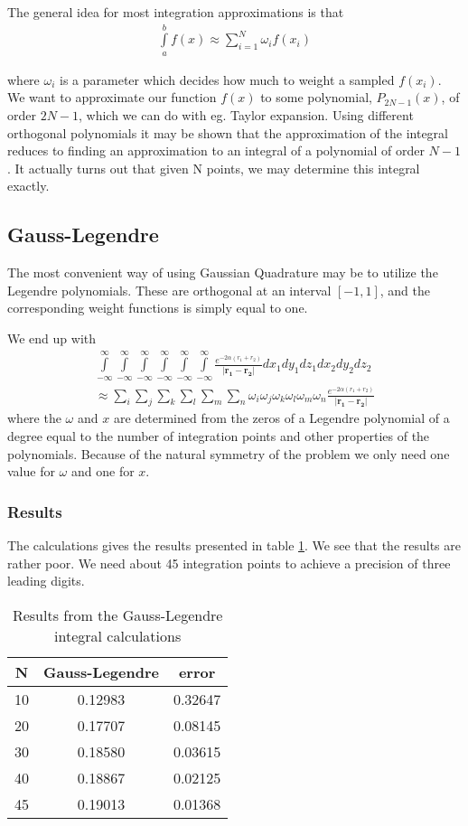 \documentclass[11pt, a4paper]{article}
\begin{document}
The general idea for most integration approximations is that
\begin{gather}
\int\limits_a^b f(x) \approx \sum\limits_{i=1}^N\omega_if(x_i)
\end{gather}

where $\omega_i$ is a parameter which decides how much to weight a sampled $f(x_i)$. We want to approximate our function $f(x)$ to some polynomial, $P_{2N-1}(x)$, of order $2N-1$, which we can do with eg. Taylor expansion. Using different orthogonal polynomials it may be shown that the approximation of the integral reduces to finding an approximation to an integral of a polynomial of order $N-1$. It actually turns out that given N points, we may determine this integral exactly.

\subsection{Gauss-Legendre}
The most convenient way of using Gaussian Quadrature may be to utilize the Legendre polynomials. These are orthogonal at an interval $[-1,1]$, and the corresponding weight functions is simply equal to one.

We end up with 
\begin{gather}
\int\limits_{-\infty}^\infty\int\limits_{-\infty}^\infty\int\limits_{-\infty}^\infty\int\limits_{-\infty}^\infty\int\limits_{-\infty}^\infty\int\limits_{-\infty}^\infty \frac{e^{-2\alpha(r_1+r_2)}}{|\mathbf{r_1}-\mathbf{r_2}|} dx_1dy_1dz_1dx_2dy_2dz_2\\
\approx \sum\limits_i\sum\limits_j\sum\limits_k\sum\limits_l\sum\limits_m\sum\limits_n \omega_i\omega_j\omega_k\omega_l\omega_m\omega_n \frac{e^{-2\alpha(r_1+r_2)}}{|\mathbf{r_1}-\mathbf{r_2}|}
\end{gather}
where the $\omega$ and $x$ are determined from the zeros of a Legendre polynomial of a degree equal to the number of integration points and other properties of the polynomials. 
Because of the natural symmetry of the problem we only need one value for $\omega$ and one for $x$.
\subsubsection*{Results}
The calculations gives the results presented in table \ref{tab:gleg}. We see that the results are rather poor. We need about 45 integration points to achieve a precision of three leading digits. 
\begin{table}[!ht]
\centering
\begin{tabular}{c|c|c}
N & Gauss-Legendre & error\\
\hline
10 & 0.12983 & 0.32647\\
20 & 0.17707 & 0.08145\\
30 & 0.18580 & 0.03615\\
40 & 0.18867 & 0.02125\\
45 & 0.19013 & 0.01368
\end{tabular}
\caption{Results from the Gauss-Legendre integral calculations}
\label{tab:gleg}
\end{table}
\end{document}

